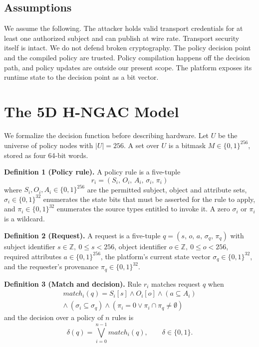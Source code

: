 \documentclass[conference]{IEEEtran}
\begin{document}
\subsection{Assumptions}

We assume the following. The attacker holds valid transport credentials for at least one authorized subject and can publish at wire rate. Transport security itself is intact. We do not defend broken cryptography. The policy decision point and the compiled policy are trusted. Policy compilation happens off the decision path, and policy updates are outside our present scope. The platform exposes its runtime state to the decision point as a bit vector.

\section{The 5D H-NGAC Model}

We formalize the decision function before describing hardware. Let $U$ be the universe of policy nodes with $|U| = 256$. A set over $U$ is a bitmask $M \in \{0,1\}^{256}$, stored as four 64-bit words.

\textbf{Definition 1 (Policy rule).} A policy rule is a five-tuple
\begin{equation}
r_i = (S_i,\, O_i,\, A_i,\, \sigma_i,\, \pi_i)
\end{equation}
where $S_i, O_i, A_i \in \{0,1\}^{256}$ are the permitted subject, object and attribute sets, $\sigma_i \in \{0,1\}^{32}$ enumerates the state bits that must be asserted for the rule to apply, and $\pi_i \in \{0,1\}^{32}$ enumerates the source types entitled to invoke it. A zero $\sigma_i$ or $\pi_i$ is a wildcard.

\textbf{Definition 2 (Request).} A request is a five-tuple $q = (s,\, o,\, a,\, \sigma_q,\, \pi_q)$ with subject identifier $s \in \mathbb{Z},\ 0 \le s < 256$, object identifier $o \in \mathbb{Z},\ 0 \le o < 256$, required attributes $a \in \{0,1\}^{256}$, the platform's current state vector $\sigma_q \in \{0,1\}^{32}$, and the requester's provenance $\pi_q \in \{0,1\}^{32}$.

\textbf{Definition 3 (Match and decision).} Rule $r_i$ matches request $q$ when
\begin{equation}
\begin{split}
\mathit{match}_i(q) = S_i[s] \wedge O_i[o] \wedge (a \subseteq A_i) \\
\wedge\ (\sigma_i \subseteq \sigma_q) \wedge (\pi_i = 0 \vee \pi_i \cap \pi_q \neq \emptyset)
\end{split}
\end{equation}
and the decision over a policy of $n$ rules is
\begin{equation}
\delta(q) = \bigvee_{i=0}^{n-1} \mathit{match}_i(q), \qquad \delta \in \{0,1\}.
\end{equation}
\end{document}
